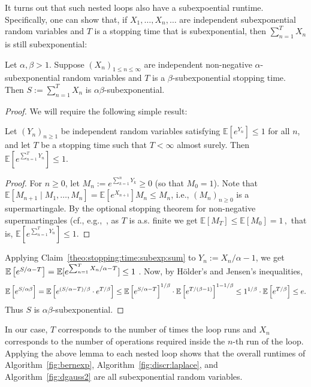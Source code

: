 \documentclass{jpc}
\newcommand{\ex}[2]{{\ifx&#1& \mathbb{E} \else
\underset{#1}{\mathbb{E}} \fi \left[#2\right]}}
\newcommand{\eqdef}{:=}
\begin{document}
It turns out that such nested loops also have a subexpoential runtime. Specifically, one can show that, if $X_1,\dots,X_n,\dots$ are independent subexponential random variables and $T$ is a stopping time that is subexponential, then $\sum_{n=1}^T X_n$ is still subexponential:
\begin{lem}
Let $\alpha,\beta>1$.
Suppose $(X_n)_{1\leq n\leq \infty}$ are independent non-negative $\alpha$-subexponential random variables and $T$ is a $\beta$-subexponential stopping time. Then $S \eqdef \sum_{n=1}^T X_n$ is $\alpha\beta$-subexponential.
\end{lem}
\begin{proof}
We will require the following simple result:
\begin{clm}
  \label{theo:stopping:time:subexp:sum}
Let $(Y_n)_{n\geq 1}$ be independent random variables satisfying $\mathbb{E}[e^{Y_n}] \leq 1$ for all $n$, and let $T$ be a stopping time such that $T < \infty$ almost surely. Then $\mathbb{E}[e^{\sum_{n=1}^T Y_n}] \leq 1$.
\end{clm}
\begin{proof}
    For $n\geq 0$, let $M_n \eqdef e^{\sum_{k=1}^n Y_k} \geq 0$ (so that $M_0=1$). Note that 
    $
      \mathbb{E}[ M_{n+1} \mid M_1,\dots, M_n ] = \mathbb{E}[ e^{X_{n+1}} ] M_n \leq M_n
    $, i.e., $(M_n)_{n\geq 0}$ is a supermartingale. By the optional stopping theorem for non-negative supermartingales (cf., e.g.,~\cite[Corollary~10.10(d)]{Williams91}, as $T$ is a.s. finite we get
    $
        \mathbb{E}[ M_T ] \leq \mathbb{E}[ M_0 ] = 1 \,,
    $
    that is, $\mathbb{E}[ e^{\sum_{n=1}^T Y_n} ] \leq 1$.
\end{proof}
Applying Claim~\ref{theo:stopping:time:subexp:sum} to $Y_n \eqdef X_n/\alpha-1$, we get
$
    \ex{}{e^{S/\alpha-T}}=\mathbb{E}[ e^{\sum_{n=1}^T X_n/\alpha - T} ] \leq 1
$ 
. 
Now, by H\"older's and Jensen's inequalities,
\[
    \ex{}{e^{S/\alpha\beta}} = \ex{}{e^{(S/\alpha-T)/\beta} \cdot e^{T/\beta}} \le \ex{}{e^{S/\alpha-T}}^{1/\beta} \cdot \ex{}{e^{T/(\beta-1)}}^{1-1/\beta} \le 1^{1/\beta} \cdot \ex{}{e^{T/\beta}} \le e.
\]
Thus $S$ is $\alpha\beta$-subexponential.
\end{proof}
In our case, $T$ corresponds to the number of times the loop runs and $X_n$ corresponds to the number of operations required inside the $n$-th run of the loop. Applying the above lemma to each nested loop shows that the overall runtimes of Algorithm~\ref{fig:bernexp}, Algorithm~\ref{fig:discr:laplace}, and Algorithm~\ref{fig:dgauss2} are all subexponential random variables.
\end{document}
